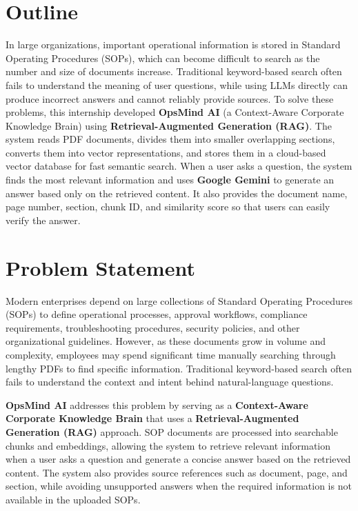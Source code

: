 \section{Outline}
\label{sec:intro_outline}

In large organizations, important operational information is stored in Standard Operating Procedures (SOPs), which can become difficult to search as the number and size of documents increase. Traditional keyword-based search often fails to understand the meaning of user questions, while using LLMs directly can produce incorrect answers and cannot reliably provide sources. To solve these problems, this internship developed \textbf{OpsMind AI} (a Context-Aware Corporate Knowledge Brain) using \textbf{Retrieval-Augmented Generation (RAG)}. The system reads PDF documents, divides them into smaller overlapping sections, converts them into vector representations, and stores them in a cloud-based vector database for fast semantic search. When a user asks a question, the system finds the most relevant information and uses \textbf{Google Gemini} to generate an answer based only on the retrieved content. It also provides the document name, page number, section, chunk ID, and similarity score so that users can easily verify the answer.

\section{Problem Statement}
\label{sec:intro_problem_statement}

Modern enterprises depend on large collections of Standard Operating Procedures (SOPs) to define operational processes, approval workflows, compliance requirements, troubleshooting procedures, security policies, and other organizational guidelines. However, as these documents grow in volume and complexity, employees may spend significant time manually searching through lengthy PDFs to find specific information. Traditional keyword-based search often fails to understand the context and intent behind natural-language questions.

\textbf{OpsMind AI} addresses this problem by serving as a \textbf{Context-Aware Corporate Knowledge Brain} that uses a \textbf{Retrieval-Augmented Generation (RAG)} approach. SOP documents are processed into searchable chunks and embeddings, allowing the system to retrieve relevant information when a user asks a question and generate a concise answer based on the retrieved content. The system also provides source references such as document, page, and section, while avoiding unsupported answers when the required information is not available in the uploaded SOPs.

